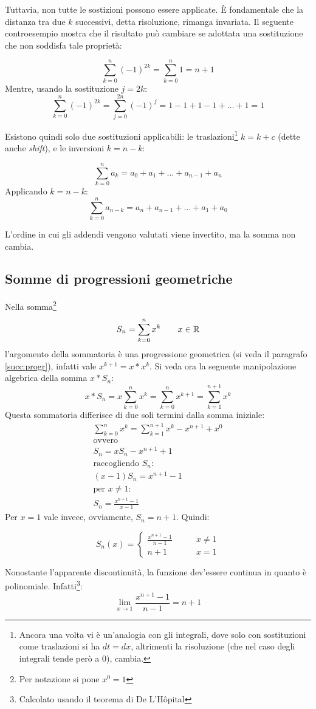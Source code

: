 Tuttavia, non tutte le sostizioni possono essere applicate. È fondamentale che la distanza tra due $k$ successivi, detta risoluzione, rimanga invariata. Il seguente controesempio mostra che il risultato può cambiare se adottata una sostituzione che non soddisfa tale proprietà:
\begin{examp}
	\[
		\sum_{k=0}^n (-1)^{2k}=\sum_{k=0}^n 1 = n+1
	\]
	Mentre, usando la sostituzione $j=2k$:
	\[
		\sum_{k=0}^n (-1)^{2k}=\sum_{j=0}^{2n}(-1)^j=1-1+1-1+\dots+1=1
	\]
\end{examp}
Esistono quindi solo due sostituzioni applicabili: le traslazioni\footnote{Ancora una volta vi è un'analogia con gli integrali, dove solo con sostituzioni come traslazioni si ha $dt=dx$, altrimenti la risoluzione (che nel caso degli integrali tende però a $0$), cambia.} $k=k+c$ (dette anche \emph{shift}), e le inversioni $k=n-k$:
\begin{examp}
	\[
		\sum_{k=0}^n a_k=a_0+a_1+\dots+a_{n-1}+a_n
	\]
	Applicando $k=n-k$:
	\[
		\sum_{k=0}^n a_{n-k}=a_n+a_{n-1}+\dots+a_1+a_0
	\]
\end{examp}
L'ordine in cui gli addendi vengono valutati viene invertito, ma la somma non cambia.


\subsection{Somme di progressioni geometriche}
\label{sum:geompar}
Nella somma\footnote{Per notazione si pone $x^0=1$}
\[
	S_n=\sum_{k=0}^n x^k\qquad x\in\mathbb{R}
\]
l'argomento della sommatoria è una progressione geometrica (si veda il paragrafo \vref{succ:progr}), infatti vale $x^{k+1}=x*x^k$. Si veda ora la seguente manipolazione algebrica della somma $x*S_n$:
\[
	x*S_n=x\sum_{k=0}^n x^k=\sum_{k=0}^n x^{k+1}=\sum_{k=1}^{n+1} x^k
\]
Questa sommatoria differisce di due soli termini dalla somma iniziale:
\begin{gather*}
	\sum_{k=0}^n x^k=\sum_{k=1}^{n+1} x^k-x^{n+1}+x^0\\
	\text{ovvero}\\
	S_n=xS_n-x^{n+1}+1\\
	\text{raccogliendo $S_n$:}\\
	(x-1)S_n=x^{n+1}-1\\
	\text{per $x\neq1$:}\\
	S_n=\frac{x^{n+1}-1}{x-1}
\end{gather*}
Per $x=1$ vale invece, ovviamente, $S_n=n+1$. Quindi:
\begin{prop}
	\label{sum:geom}
	\[
		S_n(x)=
		\begin{cases}
			\frac{x^{n+1}-1}{n-1}\qquad & x\neq1 \\
			n+1\qquad                   & x=1
		\end{cases}
	\]
\end{prop}
Nonostante l'apparente discontinuità, la funzione dev'essere continua in quanto è polinomiale. Infatti\footnote{Calcolato usando il teorema di De L'Hôpital}:
\[
	\lim_{x\to1}\frac{x^{n+1}-1}{n-1}=n+1
\]


